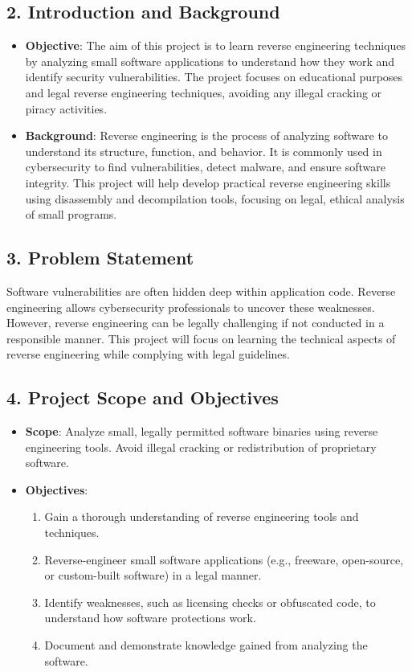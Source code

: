 \documentclass{article}
\begin{document}
\subsection*{2. Introduction and Background}
\begin{itemize}
    \item \textbf{Objective}: The aim of this project is to learn reverse engineering techniques by analyzing small software applications to understand how they work and identify security vulnerabilities. The project focuses on educational purposes and legal reverse engineering techniques, avoiding any illegal cracking or piracy activities.
    \item \textbf{Background}: Reverse engineering is the process of analyzing software to understand its structure, function, and behavior. It is commonly used in cybersecurity to find vulnerabilities, detect malware, and ensure software integrity. This project will help develop practical reverse engineering skills using disassembly and decompilation tools, focusing on legal, ethical analysis of small programs.
\end{itemize}

\subsection*{3. Problem Statement}
Software vulnerabilities are often hidden deep within application code. Reverse engineering allows cybersecurity professionals to uncover these weaknesses. However, reverse engineering can be legally challenging if not conducted in a responsible manner. This project will focus on learning the technical aspects of reverse engineering while complying with legal guidelines.

\subsection*{4. Project Scope and Objectives}
\begin{itemize}
    \item \textbf{Scope}: Analyze small, legally permitted software binaries using reverse engineering tools. Avoid illegal cracking or redistribution of proprietary software.
    \item \textbf{Objectives}:
    \begin{enumerate}
        \item Gain a thorough understanding of reverse engineering tools and techniques.
        \item Reverse-engineer small software applications (e.g., freeware, open-source, or custom-built software) in a legal manner.
        \item Identify weaknesses, such as licensing checks or obfuscated code, to understand how software protections work.
        \item Document and demonstrate knowledge gained from analyzing the software.
    \end{enumerate}
\end{itemize}
\end{document}
